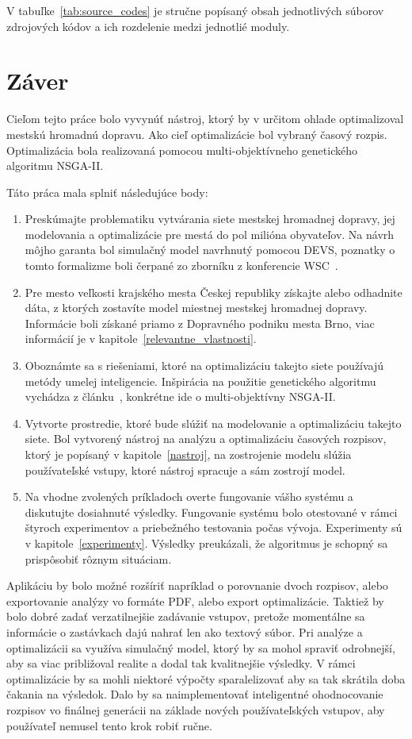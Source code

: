 V tabuľke~\ref{tab:source_codes} je stručne popísaný obsah jednotlivých súborov zdrojových kódov a ich rozdelenie medzi jednotlié moduly.

\chapter{Záver}\label{zaver}

Cieľom tejto práce bolo vyvynúť nástroj, ktorý by v určitom ohlade optimalizoval mestskú hromadnú dopravu.
Ako cieľ optimalizácie bol vybraný časový rozpis.
Optimalizácia bola realizovaná pomocou multi-objektívneho genetického algoritmu NSGA-II.

Táto práca mala splniť následujúce body:
\begin{enumerate}
  \item Preskúmajte problematiku vytvárania siete mestskej hromadnej dopravy, jej modelovania a optimalizácie pre mestá do pol milióna obyvateľov. Na návrh môjho garanta bol simulačný model navrhnutý pomocou DEVS, poznatky o tomto formalizme boli čerpané zo zborníku z konferencie WSC~\cite{tendeloo2018discrete}. 
  \item Pre mesto veľkosti krajského mesta Českej republiky získajte alebo odhadnite dáta, z ktorých zostavíte model miestnej mestskej hromadnej dopravy. Informácie boli získané priamo z Dopravného podniku mesta Brno, viac informácií je v kapitole~\ref{relevantne_vlastnosti}.
  \item Oboznámte sa s riešeniami, ktoré na optimalizáciu takejto siete používajú metódy umelej inteligencie. Inšpirácia na použitie genetického algoritmu vychádza z článku~\cite{tang2021data}, konkrétne ide o multi-objektívny NSGA-II.\@
  \item Vytvorte prostredie, ktoré bude slúžiť na modelovanie a optimalizáciu takejto siete. Bol vytvorený nástroj na analýzu a optimalizáciu časových rozpisov, ktorý je popísaný v kapitole~\ref{nastroj}, na zostrojenie modelu slúžia používateľské vstupy, ktoré nástroj spracuje a sám zostrojí model.
  \item Na vhodne zvolených príkladoch overte fungovanie vášho systému a diskutujte dosiahnuté výsledky. Fungovanie systému bolo otestované v rámci štyroch experimentov a priebežného testovania počas vývoja. Experimenty sú v kapitole~\ref{experimenty}. Výsledky preukázali, že algoritmus je schopný sa prispôsobiť rôznym situáciam.
\end{enumerate}

Aplikáciu by bolo možné rozšíriť napríklad o porovnanie dvoch rozpisov, alebo exportovanie analýzy vo formáte PDF, alebo export optimalizácie.
Taktiež by bolo dobré zadať verzatilnejšie zadávanie vstupov, pretože momentálne sa informácie o zastávkach dajú nahrať len ako textový súbor.
Pri analýze a optimalizácii sa využíva simulačný model, ktorý by sa mohol spraviť odrobnejší, aby sa viac približoval realite a dodal tak kvalitnejšie výsledky.
V rámci optimalizácie by sa mohli niektoré výpočty sparalelizovať aby sa tak skrátila doba čakania na výsledok.
Dalo by sa naimplementovať inteligentné ohodnocovanie rozpisov vo finálnej generácii na základe nových používateľských vstupov, aby používateľ nemusel tento krok robiť ručne.
